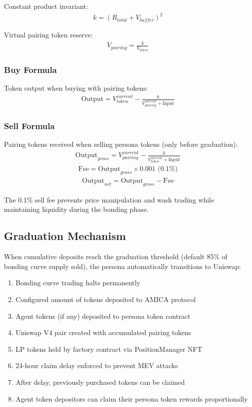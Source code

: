 \documentclass{article}
\begin{document}
Constant product invariant:
\begin{align}
k = (R_{total} + V_{buffer})^2
\end{align}

Virtual pairing token reserve:
\begin{align}
V_{pairing} = \frac{k}{V_{token}}
\end{align}

\subsubsection{Buy Formula}

Token output when buying with pairing tokens:
\begin{align}
\text{Output} = V_{token}^{current} - \frac{k}{V_{pairing}^{current} + \text{Input}}
\end{align}

\subsubsection{Sell Formula}

Pairing tokens received when selling persona tokens (only before graduation):
\begin{align}
\text{Output}_{gross} = V_{pairing}^{current} - \frac{k}{V_{token}^{current} + \text{Input}}
\end{align}
\begin{align}
\text{Fee} = \text{Output}_{gross} \times 0.001 \text{ (0.1\%)}
\end{align}
\begin{align}
\text{Output}_{net} = \text{Output}_{gross} - \text{Fee}
\end{align}

The 0.1\% sell fee prevents price manipulation and wash trading while maintaining liquidity during the bonding phase.

\subsection{Graduation Mechanism}

When cumulative deposits reach the graduation threshold (default 85\% of bonding curve supply sold), the persona automatically transitions to Uniswap:

\begin{enumerate}
    \item Bonding curve trading halts permanently
    \item Configured amount of tokens deposited to AMICA protocol
    \item Agent tokens (if any) deposited to persona token contract
    \item Uniswap V4 pair created with accumulated pairing tokens
    \item LP tokens held by factory contract via PositionManager NFT
    \item 24-hour claim delay enforced to prevent MEV attacks
    \item After delay, previously purchased tokens can be claimed
    \item Agent token depositors can claim their persona token rewards proportionally
\end{enumerate}
\end{document}
